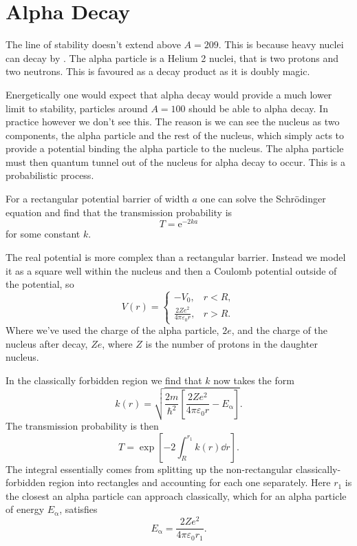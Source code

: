 \documentclass[fleqn]{NotesClass}
\newcommand*{\Palpha}{\ensuremath{\upalpha}}
\newcommand{\e}{\mathrm{e}}
\begin{document}
    \chapter{Alpha Decay}
    The line of stability doesn't extend above \(A = 209\).
    This is because heavy nuclei can decay by .
    The alpha particle is a Helium 2 nuclei, that is two protons and two neutrons.
    This is favoured as a decay product as it is doubly magic.
    
    Energetically one would expect that alpha decay would provide a much lower limit to stability, particles around \(A = 100\) should be able to alpha decay.
    In practice however we don't see this.
    The reason is we can see the nucleus as two components, the alpha particle and the rest of the nucleus, which simply acts to provide a potential binding the alpha particle to the nucleus.
    The alpha particle must then quantum tunnel out of the nucleus for alpha decay to occur.
    This is a probabilistic process.
    
    For a rectangular potential barrier of width \(a\) one can solve the Schr\"odinger equation and find that the transmission probability is
    \begin{equation}
        T = \e^{-2ka}
    \end{equation}
    for some constant \(k\).
    
    The real potential is more complex than a rectangular barrier.
    Instead we model it as a square well within the nucleus and then a Coulomb potential outside of the potential, so
    \begin{equation}
        V(r) = 
        \begin{cases}
            -V_0, & r < R,\\
            \frac{2Ze^2}{4\pi\varepsilon_0r}, & r > R.
        \end{cases}
    \end{equation}
    Where we've used the charge of the alpha particle, \(2e\), and the charge of the nucleus after decay, \(Ze\), where \(Z\) is the number of protons in the daughter nucleus.
    
    In the classically forbidden region we find that \(k\) now takes the form
    \begin{equation}
        k(r) = \sqrt{\frac{2m}{\hbar^2} \left[ \frac{2Ze^2}{4\pi\varepsilon_0r} - E_{\Palpha} \right]}.
    \end{equation}
    The transmission probability is then
    \begin{equation}
        T = \exp\left[ -2\int_{R}^{r_1} k(r) \dd{r} \right].
    \end{equation}
    The integral essentially comes from splitting up the non-rectangular classically-forbidden region into rectangles and accounting for each one separately.
    Here \(r_1\) is the closest an alpha particle can approach classically, which for an alpha particle of energy \(E_{\Palpha}\), satisfies
    \begin{equation}
        E_{\Palpha} = \frac{2Ze^2}{4\pi\varepsilon_0r_1}.
    \end{equation}
    
\end{document}
